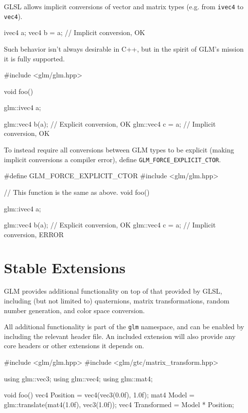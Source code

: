 \documentclass{scrartcl}
\numberwithin{figure}{subsection}
\begin{document}
GLSL allows implicit conversions of vector and matrix types (e.g. from \verb|ivec4| to \verb|vec4|).

\begin{glslcode}
ivec4 a;
vec4 b = a; // Implicit conversion, OK
\end{glslcode}

Such behavior isn't always desirable in C++, but in the spirit of GLM's mission it is fully supported.

\begin{cppcode}
#include <glm/glm.hpp>

void foo()
{
  glm::ivec4 a;

  glm::vec4 b(a); // Explicit conversion, OK
  glm::vec4 c = a; // Implicit conversion, OK
}
\end{cppcode}

To instead require all conversions between GLM types to be explicit (making implicit conversions a compiler error), define \verb|GLM_FORCE_EXPLICIT_CTOR|.

\begin{cppcode}
#define GLM_FORCE_EXPLICIT_CTOR
#include <glm/glm.hpp>

// This function is the same as above.
void foo()
{
  glm::ivec4 a;

  glm::vec4 b(a); // Explicit conversion, OK
  glm::vec4 c = a; // Implicit conversion, ERROR
}
\end{cppcode}

\section{Stable Extensions}

GLM provides additional functionality on top of that provided by GLSL, including (but not limited to) quaternions, matrix transformations, random number generation, and color space conversion.   

All additional functionality is part of the \verb|glm| namespace, and can be enabled by including the relevant header file.  An included extension will also provide any core headers or other extensions it depends on.

\begin{cppcode}
#include <glm/glm.hpp>
#include <glm/gtc/matrix_transform.hpp>

using glm::vec3;
using glm::vec4;
using glm::mat4;

void foo()
{
  vec4 Position = vec4(vec3(0.0f), 1.0f);
  mat4 Model = glm::translate(mat4(1.0f), vec3(1.0f));
  vec4 Transformed = Model * Position;
}
\end{cppcode}
\end{document}
